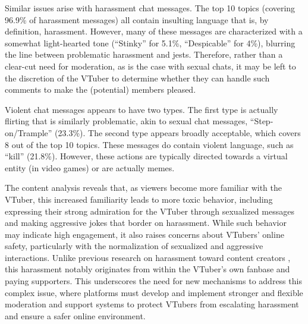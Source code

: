 Similar issues arise with harassment chat messages. The top 10 topics (covering 96.9\% of harassment messages) all contain insulting language that is, by definition, harassment. However, many of these messages are characterized with a somewhat light-hearted tone (\eg ``Stinky'' for 5.1\%, ``Despicable'' for 4\%), blurring the line between problematic harassment and jests. Therefore, rather than a clear-cut need for moderation, as is the case with sexual chats, it may be left to the discretion of the VTuber to determine whether they can handle such comments to make the (potential) members pleased.


Violent chat messages appears to have two types. The first type is actually flirting that is similarly problematic, akin to sexual chat messages, \eg ``Step-on/Trample'' (23.3\%).
The second type appears broadly acceptable, which covers 8 out of the top 10 topics. These messages do contain violent language, such as ``kill'' (21.8\%). However, these actions are typically directed towards a virtual entity (\eg in video games) or are actually memes. 

The content analysis reveals that, as viewers become more familiar with the VTuber, this increased familiarity leads to more toxic behavior, including expressing their strong admiration for the VTuber through sexualized messages and making aggressive jokes that border on harassment. 
While such behavior may indicate high engagement, it also raises concerns about VTubers' online safety, particularly with the normalization of sexualized and aggressive interactions. Unlike previous research on harassment toward content creators \cite{10.1145/3613904.3641949, 10.1145/3491102.3501879}, this harassment notably originates from within the VTuber's own fanbase and paying supporters. This underscores the need for new mechanisms to address this complex issue, where platforms must develop and implement stronger and flexible moderation and support systems to protect VTubers from escalating harassment and ensure a safer online environment.





